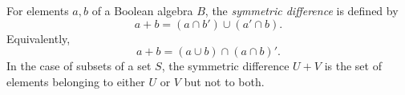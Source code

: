 For elements $a, b$ of a Boolean algebra $B$, the \emph{symmetric difference} is defined by
$$a + b = (a \cap b') \cup (a' \cap b).$$
Equivalently,
$$a + b = (a \cup b) \cap (a \cap b)'.$$
In the case of subsets of a set $S$, the symmetric difference $U + V$ is the set of elements belonging to either $U$ or $V$ but not to both.
